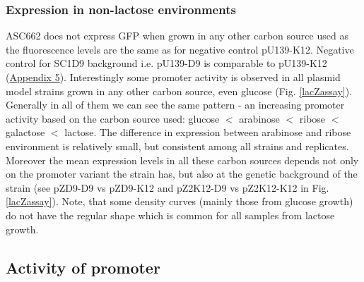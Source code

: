 \subsubsection{Expression in non-lactose environments}
ASC662 does not express GFP when grown in any other carbon source used as the fluorescence levels are the same as for negative control pU139-K12.
Negative control for SC1\textunderscore D9 background i.e. pU139-D9 is comparable to pU139-K12 (\hyperlink{FCnegs}{Appendix 5}).
Interestingly some  promoter activity is observed in all plasmid model strains grown in any other carbon source, even glucose (Fig. \ref{lacZassay}).
Generally in all of them we can see the same pattern - an increasing  promoter activity based on the carbon source used: glucose $<$ arabinose $<$ ribose $<$ galactose $<$ lactose.
The difference in expression between arabinose and ribose environment is relatively small, but consistent among all strains and replicates.
Moreover the mean expression levels in all these carbon sources depends not only on the promoter variant the strain has, but also at the genetic background of the strain (see pZ\textunderscore D9-D9 vs pZ\textunderscore D9-K12 and pZ2\textunderscore K12-D9 vs pZ2\textunderscore K12-K12 in Fig. \ref{lacZassay}).
Note, that some density curves (mainly those from glucose growth) do not have the regular shape which is common for all samples from lactose growth.

\subsection{Activity of  promoter}

